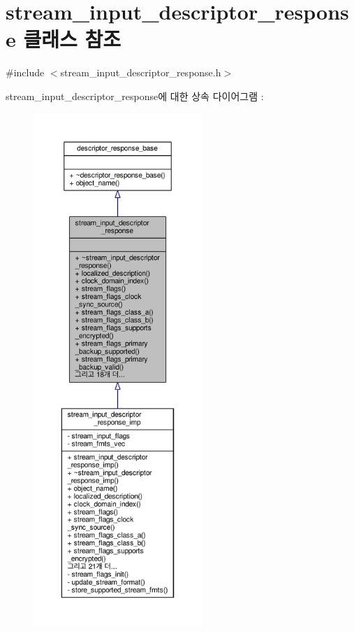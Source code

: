 \hypertarget{classavdecc__lib_1_1stream__input__descriptor__response}{}\section{stream\+\_\+input\+\_\+descriptor\+\_\+response 클래스 참조}
\label{classavdecc__lib_1_1stream__input__descriptor__response}


{\ttfamily \#include $<$stream\+\_\+input\+\_\+descriptor\+\_\+response.\+h$>$}



stream\+\_\+input\+\_\+descriptor\+\_\+response에 대한 상속 다이어그램 \+: 
\nopagebreak
\begin{figure}[H]
\begin{center}
\leavevmode
\includegraphics[height=550pt]{classavdecc__lib_1_1stream__input__descriptor__response__inherit__graph}
\end{center}
\end{figure}


